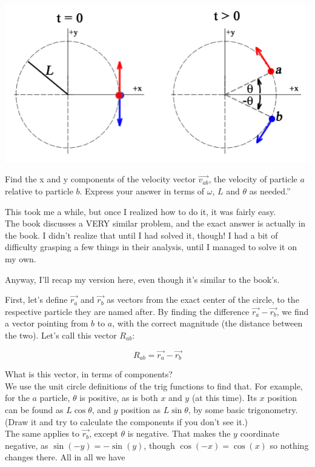 \documentclass[8.01x]{subfiles}
\begin{document}
\begin{center}
\includegraphics[scale=0.75]{Graphics/h2p8}
\end{center}

Find the x and y components of the velocity vector $\vec{v_{ab}}$, the velocity of particle $a$ relative to particle $b$. Express your answer in terms of $\omega$, $L$ and $\theta$ as needed.''

This took me a while, but once I realized how to do it, it was fairly easy.\\
The book discusses a VERY similar problem, and the exact answer is actually in the book. I didn't realize that until I had solved it, though! I had a bit of difficulty grasping a few things in their analysis, until I managed to solve it on my own.

Anyway, I'll recap my version here, even though it's similar to the book's.

First, let's define $\vec{r_a}$ and $\vec{r_b}$ as vectors from the exact center of the circle, to the respective particle they are named after. By finding the difference $\vec{r_a} - \vec{r_b}$, we find a vector pointing from $b$ to $a$, with the correct magnitude (the distance between the two). Let's call this vector $R_{ab}$:

\begin{equation}
R_{ab} = \vec{r_a} - \vec{r_b}
\end{equation}

What is this vector, in terms of components?\\
We use the unit circle definitions of the trig functions to find that. For example, for the $a$ particle, $\theta$ is positive, as is both $x$ and $y$ (at this time). Its $x$ position can be found as $L \cos \theta$, and $y$ position as $L \sin \theta$, by some basic trigonometry. (Draw it and try to calculate the components if you don't see it.)\\
The same applies to $\vec{r_b}$, except $\theta$ is negative. That makes the $y$ coordinate negative, as $\sin(-y) = -\sin(y)$, though $\cos(-x) = \cos(x)$ so nothing changes there. All in all we have
\end{document}

